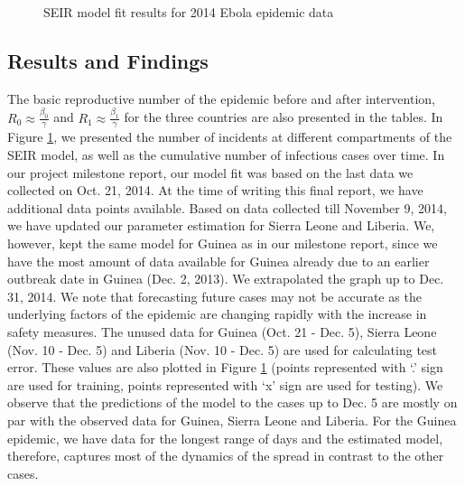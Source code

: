 \documentclass[10pt, journal,onecolumn]{IEEEtran}
\begin{document}
\begin{figure}[ht]
\quad
{}

\caption{SEIR model fit results for 2014 Ebola epidemic data}
\label{Fig:figurePrediction}
\end{figure}


\subsection{Results and Findings} The basic reproductive number of the epidemic before and after
intervention, $R_0 \approx \frac{\beta_0}{\gamma}$  and $R_1 \approx \frac{\beta_1}{\gamma}$ for the
three countries are also presented in the tables. In Figure \ref{Fig:figurePrediction}, we presented
the number of incidents at different compartments of the SEIR model, as well as the cumulative
number of infectious cases over time. In our project milestone report, our model fit was based on
the last data we collected on Oct. 21, 2014. At the time of writing this final report, we have
additional data points available. Based on data collected till November 9, 2014, we have updated our
parameter estimation for Sierra Leone and Liberia. We, however, kept the same model for Guinea as in
our milestone report, since we have the most amount of data available for Guinea already due to an
earlier outbreak date in Guinea (Dec. 2, 2013). We extrapolated the graph up to Dec. 31, 2014.  We
note that forecasting future cases may not be accurate as the underlying factors of the epidemic are
changing rapidly with the increase in safety measures. The unused data for Guinea (Oct. 21 - Dec.
5), Sierra Leone (Nov. 10 - Dec. 5) and Liberia (Nov. 10 - Dec. 5) are used for calculating test
error. These values are also plotted in Figure \ref{Fig:figurePrediction} (points represented with
`.' sign are used for training, points represented with `x' sign are used for testing). We observe
that the predictions of the model to the cases up to Dec. 5 are mostly on par with the observed data
for Guinea, Sierra Leone and Liberia. For the Guinea epidemic, we have data for the longest range of
days and the estimated model, therefore, captures most of the dynamics of the spread in contrast to
the other cases.
\end{document}
